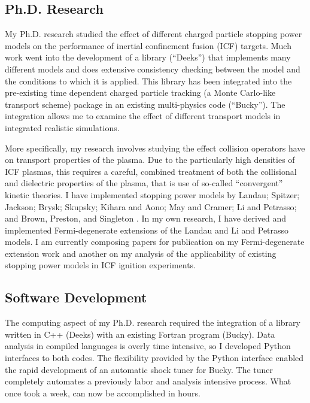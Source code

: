 \documentclass[letterpaper,11pt]{article}
\begin{document}
\subsection*{Ph.D. Research}
My Ph.D. research studied the effect of different charged particle stopping
power models on the performance of inertial confinement fusion (ICF) targets.
Much work went into the development of a library (``Deeks'') that implements
many different models and does extensive consistency checking between the model
and the conditions to which it is applied.  This library has been integrated
into the pre-existing time dependent charged particle tracking (a Monte
Carlo-like transport scheme) package in an existing multi-physics code
(``Bucky'').  The integration allows me to examine the effect of different
transport models in integrated realistic simulations.

\vspace{0.1in}

More specifically, my research involves studying the effect collision operators have on transport properties of the plasma.  Due to the particularly high densities of ICF plasmas, this requires a careful, combined treatment of both the collisional and dielectric properties of the plasma, that is use of so-called ``convergent'' kinetic theories.  I have implemented stopping power models by 
Landau; 
Spitzer; 
Jackson; 
Brysk; 
Skupsky; 
Kihara and Aono; 
May and Cramer; 
Li and Petrasso; 
and 
Brown, Preston, and Singleton%
.
In my own research, I have derived and implemented Fermi-degenerate extensions of the Landau and Li and Petrasso models.  I am currently composing papers for publication on my Fermi-degenerate extension work and another on my analysis of the applicability of existing stopping power models in ICF ignition experiments.  


\subsection*{Software Development}
The computing aspect of my Ph.D. research required the integration of a library
written in C++ (Deeks) with an existing Fortran program (Bucky).  Data analysis
in compiled languages is overly time intensive, so I developed Python
interfaces to both codes.  The flexibility provided by the Python interface
enabled the rapid development of an automatic shock tuner for Bucky.  The tuner
completely automates a previously labor and analysis intensive process.  What
once took a week, can now be accomplished in hours.
\end{document}
